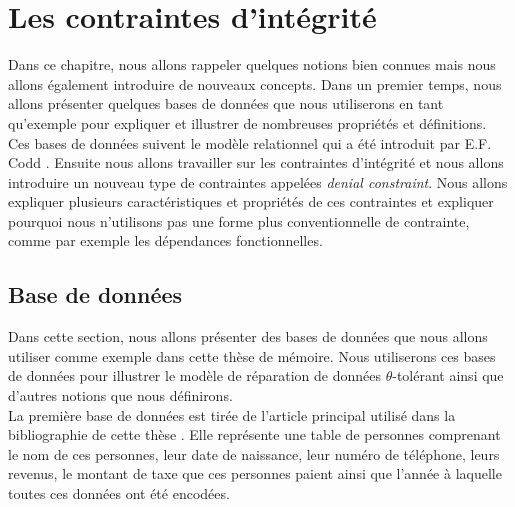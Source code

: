 \documentclass[letterpaper, 12pt]{report}
\theoremstyle{definition}
\newcommand{\alinea}{
\hspace*{0.5cm}}
\begin{document}
\chapter{Les contraintes d'intégrité}

\alinea Dans ce chapitre, nous allons rappeler quelques notions bien connues mais nous allons également introduire de nouveaux concepts. Dans un premier temps, nous allons présenter quelques bases de données que nous utiliserons en tant qu'exemple pour expliquer et illustrer de nombreuses propriétés et définitions. Ces bases de données suivent le modèle relationnel qui a été introduit par E.F. Codd \cite{misc1}. Ensuite nous allons travailler sur les contraintes d'intégrité et nous allons introduire un nouveau type de contraintes appelées \emph{denial constraint}. Nous allons expliquer plusieurs caractéristiques et propriétés de ces contraintes et expliquer pourquoi nous n'utilisons pas une forme plus conventionnelle de contrainte, comme par exemple les dépendances fonctionnelles.

\section{Base de données}

\alinea Dans cette section, nous allons présenter des bases de données que nous allons utiliser comme exemple dans cette thèse de mémoire. Nous utiliserons ces bases de données pour illustrer le modèle de réparation de données $\theta$-tolérant ainsi que d'autres notions que nous définirons.\\

La première base de données est tirée de l'article principal utilisé dans la bibliographie de cette thèse \cite{main}. Elle représente une table de personnes comprenant le nom de ces personnes, leur date de naissance, leur numéro de téléphone, leurs revenus, le montant de taxe que ces personnes paient ainsi que l'année à laquelle toutes ces données ont été encodées.
\end{document}
